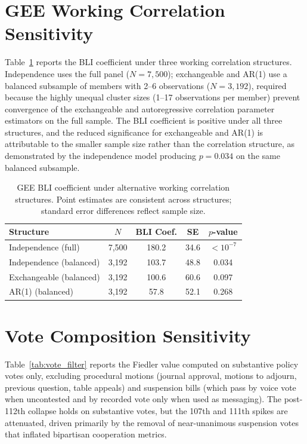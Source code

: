 \documentclass[12pt, a4paper]{article}
\begin{document}
\section{GEE Working Correlation Sensitivity}
\label{app:gee}

Table~\ref{tab:gee_sensitivity} reports the BLI coefficient under three working correlation structures. Independence uses the full panel ($N = 7{,}500$); exchangeable and AR(1) use a balanced subsample of members with 2--6 observations ($N = 3{,}192$), required because the highly unequal cluster sizes (1--17 observations per member) prevent convergence of the exchangeable and autoregressive correlation parameter estimators on the full sample. The BLI coefficient is positive under all three structures, and the reduced significance for exchangeable and AR(1) is attributable to the smaller sample size rather than the correlation structure, as demonstrated by the independence model producing $p = 0.034$ on the same balanced subsample.

\begin{table}[H]
\centering
{\small
\caption{GEE BLI coefficient under alternative working correlation structures. Point estimates are consistent across structures; standard error differences reflect sample size.}
\label{tab:gee_sensitivity}
\begin{tabular}{lcccc}
\toprule
Structure & $N$ & BLI Coef. & SE & $p$-value \\
\midrule
Independence (full) & 7,500 & 180.2 & 34.6 & $< 10^{-7}$ \\
Independence (balanced) & 3,192 & 103.7 & 48.8 & 0.034 \\
Exchangeable (balanced) & 3,192 & 100.6 & 60.6 & 0.097 \\
AR(1) (balanced) & 3,192 & 57.8 & 52.1 & 0.268 \\
\bottomrule
\end{tabular}
}
\end{table}

\section{Vote Composition Sensitivity}
\label{app:vote_filter}

Table~\ref{tab:vote_filter} reports the Fiedler value computed on substantive policy votes only, excluding procedural motions (journal approval, motions to adjourn, previous question, table appeals) and suspension bills (which pass by voice vote when uncontested and by recorded vote only when used as messaging). The post-112th collapse holds on substantive votes, but the 107th and 111th spikes are attenuated, driven primarily by the removal of near-unanimous suspension votes that inflated bipartisan cooperation metrics.
\end{document}
